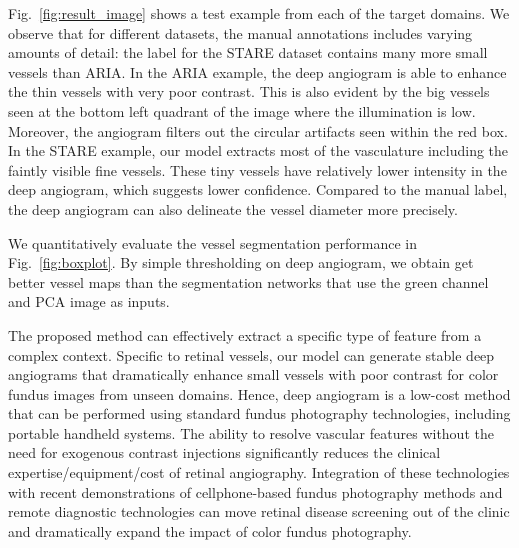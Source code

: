 \documentclass[]{spie}  %
\begin{document}
Fig.~\ref{fig:result_image} shows a test example from each of the target domains. We observe that for different datasets, the manual annotations includes varying amounts of detail: the label for the STARE dataset contains many more small vessels than ARIA. In the ARIA example, the deep angiogram is able to enhance the thin vessels with very poor contrast. This is also evident by the big vessels seen at the bottom left quadrant of the image where the illumination is low. Moreover, the angiogram filters out the circular artifacts seen within the red box. In the STARE example, our model extracts most of the vasculature including the faintly visible fine vessels. These tiny vessels  have relatively lower intensity in the deep angiogram, which suggests lower confidence. Compared to the manual label, the deep angiogram can also delineate the vessel diameter more precisely. 

We quantitatively evaluate the %
vessel segmentation performance in Fig.~\ref{fig:boxplot}. %
By simple thresholding on deep angiogram, we obtain get better vessel maps than the segmentation networks that use the green channel and PCA image as inputs. 


The proposed method can effectively extract a specific type of feature from a complex context. Specific to retinal vessels, our model can generate stable deep angiograms that dramatically enhance small vessels with poor contrast for color fundus images from unseen domains. Hence, deep angiogram is a low-cost method that can be performed using  standard fundus photography technologies, including portable handheld systems. The ability to resolve  vascular features without the need for exogenous contrast injections significantly reduces the clinical expertise/equipment/cost of retinal angiography. Integration of these technologies with recent demonstrations of cellphone-based fundus photography methods and remote diagnostic technologies can move retinal disease screening out of the clinic and dramatically expand the impact of color fundus photography.
\end{document}
